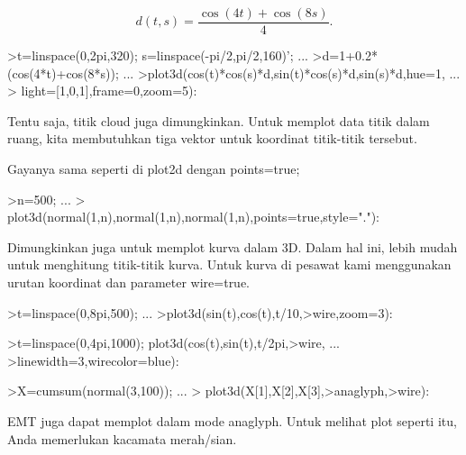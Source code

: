 \documentclass[a4paper,10pt]{article}
\begin{document}
\begin{eulernotebook}
\begin{eulercomment}
\end{eulercomment}
\begin{eulerformula}
\[
d(t,s) = \frac{\cos(4t)+\cos(8s)}{4}.
\]
\end{eulerformula}
\begin{eulerprompt}
>t=linspace(0,2pi,320); s=linspace(-pi/2,pi/2,160)'; ...
>d=1+0.2*(cos(4*t)+cos(8*s)); ...
>plot3d(cos(t)*cos(s)*d,sin(t)*cos(s)*d,sin(s)*d,hue=1, ...
>  light=[1,0,1],frame=0,zoom=5):
\end{eulerprompt}
\begin{eulercomment}
Tentu saja, titik cloud juga dimungkinkan. Untuk memplot data titik
dalam ruang, kita membutuhkan tiga vektor untuk koordinat titik-titik
tersebut.

Gayanya sama seperti di plot2d dengan points=true;
\end{eulercomment}
\begin{eulerprompt}
>n=500;  ...
>  plot3d(normal(1,n),normal(1,n),normal(1,n),points=true,style="."):
\end{eulerprompt}
\begin{eulercomment}
Dimungkinkan juga untuk memplot kurva dalam 3D. Dalam hal ini, lebih
mudah untuk menghitung titik-titik kurva. Untuk kurva di pesawat kami
menggunakan urutan koordinat dan parameter wire=true.
\end{eulercomment}
\begin{eulerprompt}
>t=linspace(0,8pi,500); ...
>plot3d(sin(t),cos(t),t/10,>wire,zoom=3):
\end{eulerprompt}
\begin{eulerprompt}
>t=linspace(0,4pi,1000); plot3d(cos(t),sin(t),t/2pi,>wire, ...
>linewidth=3,wirecolor=blue):
\end{eulerprompt}
\begin{eulerprompt}
>X=cumsum(normal(3,100)); ...
> plot3d(X[1],X[2],X[3],>anaglyph,>wire):
\end{eulerprompt}
\begin{eulercomment}
EMT juga dapat memplot dalam mode anaglyph. Untuk melihat plot seperti
itu, Anda memerlukan kacamata merah/sian.
\end{eulercomment}

\end{eulernotebook}
\end{document}
